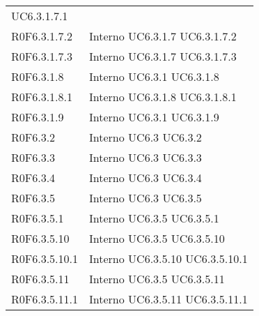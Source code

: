 \begin{longtable}{p{2.5cm}!{\VRule[1pt]}p{2.5cm}}
 \newline UC6.3.1.7.1
 \\
R0F6.3.1.7.2 & Interno \newline UC6.3.1.7
 \newline UC6.3.1.7.2
 \\
R0F6.3.1.7.3 & Interno \newline UC6.3.1.7
 \newline UC6.3.1.7.3
 \\
R0F6.3.1.8 & Interno \newline UC6.3.1
 \newline UC6.3.1.8
 \\
R0F6.3.1.8.1 & Interno \newline UC6.3.1.8
 \newline UC6.3.1.8.1
 \\
R0F6.3.1.9 & Interno \newline UC6.3.1
 \newline UC6.3.1.9
 \\
R0F6.3.2 & Interno \newline UC6.3
 \newline UC6.3.2
 \\
R0F6.3.3 & Interno \newline UC6.3
 \newline UC6.3.3
 \\
R0F6.3.4 & Interno \newline UC6.3
 \newline UC6.3.4
 \\
R0F6.3.5 & Interno \newline UC6.3
 \newline UC6.3.5
 \\
R0F6.3.5.1 & Interno \newline UC6.3.5
 \newline UC6.3.5.1
 \\
R0F6.3.5.10 & Interno \newline UC6.3.5
 \newline UC6.3.5.10
 \\
R0F6.3.5.10.1 & Interno \newline UC6.3.5.10
 \newline UC6.3.5.10.1
 \\
R0F6.3.5.11 & Interno \newline UC6.3.5
 \newline UC6.3.5.11
 \\
R0F6.3.5.11.1 & Interno \newline UC6.3.5.11
 \newline UC6.3.5.11.1

\end{longtable}
